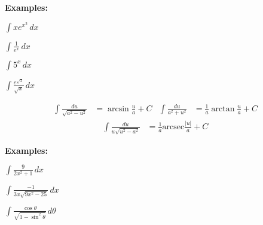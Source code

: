 \documentclass[addpoints, 12pt]{exam}
\begin{document}
\noindent\textbf{Examples:}
\begin{questions}
    \begin{minipage}{0.45\linewidth}
        \question $\displaystyle\int x e^{x^2}\,dx$
    \end{minipage}
    \hfill
    \begin{minipage}{0.45\linewidth}
        \question $\displaystyle\int\frac{1}{e^x}\,dx$
    \end{minipage}
    
    
    \begin{minipage}{0.45\linewidth}
        \question $\displaystyle\int5^x\,dx$
    \end{minipage}
    \hfill
    \begin{minipage}{0.45\linewidth}
        \question $\displaystyle\int\frac{e^{\sqrt{x}}}{\sqrt{x}}\,dx$
    \end{minipage}
    
    
\end{questions}


\newpage

\begin{tcolorbox}[title= INTEGRALS OF INVERSE TRIG FUNCTIONS,colframe=black,sharp corners,colback=white,colbacktitle=white,coltitle=black,boxrule=1pt]

    \begin{align*}
        \displaystyle\int\frac{du}{\sqrt{a^2-u^2}} &= \arcsin\frac{u}{a}+C & \displaystyle\int\frac{du}{a^2+u^2} &= \displaystyle\frac{1}{a}\arctan\frac{u}{a}+C 
    \end{align*}
    \begin{align*}
        \displaystyle\int\frac{du}{u\sqrt{u^2-a^2}} &= \frac{1}{a}\text{arcsec}\frac{|u|}{a} +C
    \end{align*}
\end{tcolorbox}
\textbf{Examples:}
\begin{questions}
    \question $\displaystyle\int\frac{9}{2x^2+1}\,dx$
    
    \question $\displaystyle\int\frac{-1}{3x\sqrt{9x^2-25}}\,dx$
    
    
    \question $\displaystyle\int\frac{\cos\theta}{\sqrt{1-\sin^2\theta}}\,d\theta$
\end{questions}
\end{document}

